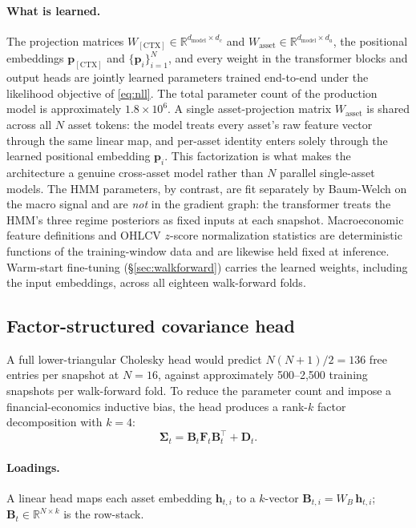 \documentclass[11pt]{article}
\newcommand{\R}{\mathbb{R}}
\newcommand{\CTX}{[\mathrm{CTX}]}
\newcommand{\Sig}{\boldsymbol{\Sigma}}
\newcommand{\bB}{\mathbf{B}}
\newcommand{\bF}{\mathbf{F}}
\newcommand{\bD}{\mathbf{D}}
\begin{document}
\paragraph{What is learned.} The projection matrices $W_{\CTX} \in
\R^{d_{\text{model}}\times d_c}$ and $W_{\text{asset}} \in
\R^{d_{\text{model}}\times d_a}$, the positional embeddings
$\mathbf{p}_{\CTX}$ and $\{\mathbf{p}_i\}_{i=1}^{N}$, and every weight
in the transformer blocks and output heads are jointly learned
parameters trained end-to-end under the likelihood objective of
\eqref{eq:nll}. The total parameter count of the production model is
approximately $1.8 \times 10^{6}$. A single asset-projection matrix
$W_{\text{asset}}$ is shared across all $N$ asset tokens: the model
treats every asset's raw feature vector through the same linear map,
and per-asset identity enters solely through the learned positional
embedding $\mathbf{p}_i$. This factorization is what makes the
architecture a genuine cross-asset model rather than $N$ parallel
single-asset models. The HMM parameters, by contrast, are fit
separately by Baum-Welch on the macro signal and are \emph{not} in
the gradient graph: the transformer treats the HMM's three regime
posteriors as fixed inputs at each snapshot. Macroeconomic feature
definitions and OHLCV $z$-score normalization statistics are
deterministic functions of the training-window data and are likewise
held fixed at inference. Warm-start fine-tuning
(\S\ref{sec:walkforward}) carries the learned weights, including the
input embeddings, across all eighteen walk-forward folds.

\subsection{Factor-structured covariance head}\label{sec:factor_head}

A full lower-triangular Cholesky head would predict $N(N{+}1)/2 = 136$
free entries per snapshot at $N=16$, against approximately 500--2,500
training snapshots per walk-forward fold. To reduce the parameter count
and impose a financial-economics inductive bias, the head produces a
rank-$k$ factor decomposition with $k = 4$:
\begin{equation}
\Sig_t = \bB_t \bF_t \bB_t^\top + \bD_t.
\label{eq:factor}
\end{equation}

\paragraph{Loadings.} A linear head maps each asset embedding
$\mathbf{h}_{t,i}$ to a $k$-vector $\bB_{t,i} = W_B\, \mathbf{h}_{t,i}$;
$\bB_t \in \R^{N\times k}$ is the row-stack.
\end{document}
